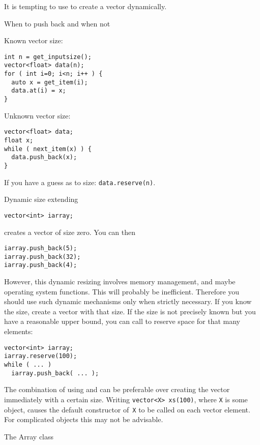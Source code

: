 It is tempting to use  to create a vector dynamically.

\begin{block}{When to push back and when not}
  \label{sl:vecpushnot}
  \begin{multicols}{2}
    Known vector size:
\begin{lstlisting}
int n = get_inputsize();
vector<float> data(n);
for ( int i=0; i<n; i++ ) {
  auto x = get_item(i);
  data.at(i) = x;
}
\end{lstlisting}
\columnbreak
    Unknown vector size:
\begin{lstlisting}
vector<float> data;
float x;
while ( next_item(x) ) {
  data.push_back(x);
}
\end{lstlisting}
  \end{multicols}
  If you have a guess as to size: \lstinline+data.reserve(n)+.
\end{block}

\begin{block}{Dynamic size extending}
  \label{sl:vector-extend}
\begin{lstlisting}
vector<int> iarray;
\end{lstlisting}
creates a vector of size zero. You can then
\begin{lstlisting}
iarray.push_back(5);
iarray.push_back(32);
iarray.push_back(4);
\end{lstlisting}
\end{block}

However, this dynamic resizing involves memory management, and maybe
operating system functions. This will probably be
inefficient. Therefore you should use such dynamic mechanisms only
when strictly necessary.
If you know the size,
create a vector with that size. If the size is not precisely known but
you have a reasonable upper bound, you can call  to
reserve space for that many elements:
\begin{lstlisting}
vector<int> iarray;
iarray.reserve(100);
while ( ... )
  iarray.push_back( ... );
\end{lstlisting}

The combination of using  and 
can be preferable over creating the vector immediately with a certain size.
Writing \lstinline+vector<X> xs(100)+, where \lstinline{X} is some object,
causes the default constructor of~\lstinline{X} to be called on each vector element.
For complicated objects this may not be advisable.

 {The Array class}
\label{sec:cpp-array}
\label{sec:stdarray}

